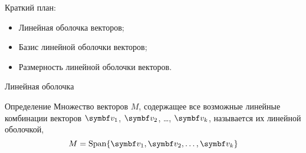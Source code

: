 
\begin{frame} %


\end{frame}



\begin{frame}{Краткий план:}
  \begin{itemize}[<+->]
    \item Линейная оболочка векторов;
    \item Базис линейной оболочки векторов;
    \item Размерность линейной оболочки векторов.
  \end{itemize}

\end{frame}


\begin{frame}{Линейная оболочка}

\begin{block}{Определение} 
Множество векторов $M$, содержащее все возможные линейные комбинации векторов $\bv_1$, 
$\bv_2$, \ldots, $\bv_k$, называется их \alert{линейной оболочкой},
\[
  M = \Span\{ \bv_1, \bv_2, \ldots, \bv_k \}
\]
\end{block}

\end{frame}



